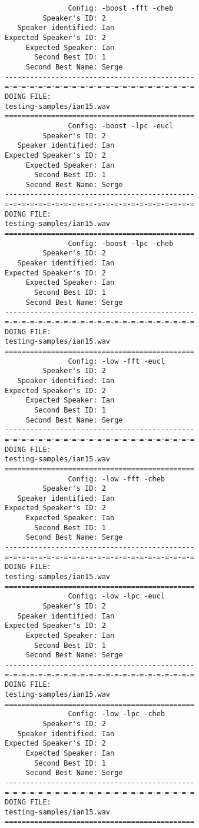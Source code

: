\begin{verbatim}
               Config: -boost -fft -cheb
         Speaker's ID: 2
   Speaker identified: Ian
Expected Speaker's ID: 2
     Expected Speaker: Ian
       Second Best ID: 1
     Second Best Name: Serge
---------------------------------------------
=-=-=-=-=-=-=-=-=-=-=-=-=-=-=-=-=-=-=-=-=-=-=
DOING FILE:
testing-samples/ian15.wav
=============================================
               Config: -boost -lpc -eucl
         Speaker's ID: 2
   Speaker identified: Ian
Expected Speaker's ID: 2
     Expected Speaker: Ian
       Second Best ID: 1
     Second Best Name: Serge
---------------------------------------------
=-=-=-=-=-=-=-=-=-=-=-=-=-=-=-=-=-=-=-=-=-=-=
DOING FILE:
testing-samples/ian15.wav
=============================================
               Config: -boost -lpc -cheb
         Speaker's ID: 2
   Speaker identified: Ian
Expected Speaker's ID: 2
     Expected Speaker: Ian
       Second Best ID: 1
     Second Best Name: Serge
---------------------------------------------
=-=-=-=-=-=-=-=-=-=-=-=-=-=-=-=-=-=-=-=-=-=-=
DOING FILE:
testing-samples/ian15.wav
=============================================
               Config: -low -fft -eucl
         Speaker's ID: 2
   Speaker identified: Ian
Expected Speaker's ID: 2
     Expected Speaker: Ian
       Second Best ID: 1
     Second Best Name: Serge
---------------------------------------------
=-=-=-=-=-=-=-=-=-=-=-=-=-=-=-=-=-=-=-=-=-=-=
DOING FILE:
testing-samples/ian15.wav
=============================================
               Config: -low -fft -cheb
         Speaker's ID: 2
   Speaker identified: Ian
Expected Speaker's ID: 2
     Expected Speaker: Ian
       Second Best ID: 1
     Second Best Name: Serge
---------------------------------------------
=-=-=-=-=-=-=-=-=-=-=-=-=-=-=-=-=-=-=-=-=-=-=
DOING FILE:
testing-samples/ian15.wav
=============================================
               Config: -low -lpc -eucl
         Speaker's ID: 2
   Speaker identified: Ian
Expected Speaker's ID: 2
     Expected Speaker: Ian
       Second Best ID: 1
     Second Best Name: Serge
---------------------------------------------
=-=-=-=-=-=-=-=-=-=-=-=-=-=-=-=-=-=-=-=-=-=-=
DOING FILE:
testing-samples/ian15.wav
=============================================
               Config: -low -lpc -cheb
         Speaker's ID: 2
   Speaker identified: Ian
Expected Speaker's ID: 2
     Expected Speaker: Ian
       Second Best ID: 1
     Second Best Name: Serge
---------------------------------------------
=-=-=-=-=-=-=-=-=-=-=-=-=-=-=-=-=-=-=-=-=-=-=
DOING FILE:
testing-samples/ian15.wav
=============================================

\end{verbatim}
